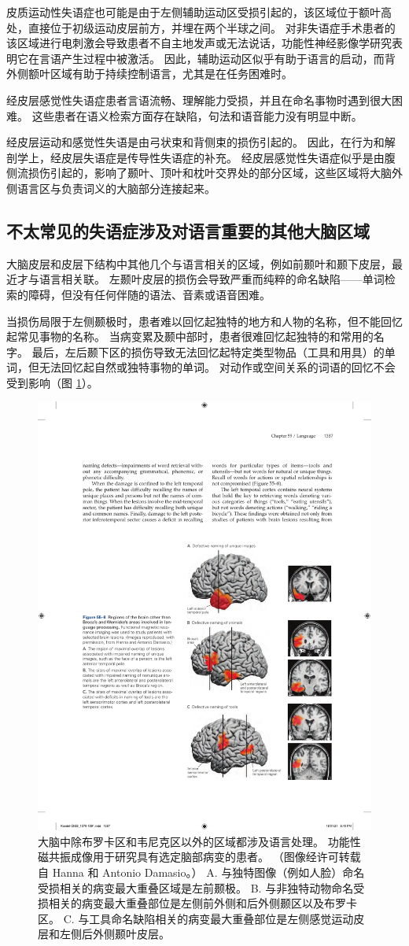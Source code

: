 皮质运动性失语症也可能是由于左侧辅助运动区受损引起的，该区域位于额叶高处，直接位于初级运动皮层前方，并埋在两个半球之间。 对非失语症手术患者的该区域进行电刺激会导致患者不自主地发声或无法说话，功能性神经影像学研究表明它在言语产生过程中被激活。 因此，辅助运动区似乎有助于语言的启动，而背外侧额叶区域有助于持续控制语言，尤其是在任务困难时。


经皮层感觉性失语症患者言语流畅、理解能力受损，并且在命名事物时遇到很大困难。 这些患者在语义检索方面存在缺陷，句法和语音能力没有明显中断。

经皮层运动和感觉性失语是由弓状束和背侧束的损伤引起的。 因此，在行为和解剖学上，经皮层失语症是传导性失语症的补充。 经皮层感觉性失语症似乎是由腹侧流损伤引起的，影响了颞叶、顶叶和枕叶交界处的部分区域，这些区域将大脑外侧语言区与负责词义的大脑部分连接起来。

\subsection{不太常见的失语症涉及对语言重要的其他大脑区域}

大脑皮层和皮层下结构中其他几个与语言相关的区域，例如前颞叶和颞下皮层，最近才与语言相关联。 左颞叶皮层的损伤会导致严重而纯粹的命名缺陷——单词检索的障碍，但没有任何伴随的语法、音素或语音困难。

当损伤局限于左侧颞极时，患者难以回忆起独特的地方和人物的名称，但不能回忆起常见事物的名称。 当病变累及颞中部时，患者很难回忆起独特的和常用的名字。 最后，左后颞下区的损伤导致无法回忆起特定类型物品（工具和用具）的单词，但无法回忆起自然或独特事物的单词。 对动作或空间关系的词语的回忆不会受到影响（图 \ref{fig:55_8}）。

\begin{figure}[htbp]
	\centering
	\includegraphics[width=0.65\linewidth]{chap55/fig_55_8}
	\caption{大脑中除布罗卡区和韦尼克区以外的区域都涉及语言处理。 功能性磁共振成像用于研究具有选定脑部病变的患者。 （图像经许可转载自 Hanna 和 Antonio Damasio。） A. 与独特图像（例如人脸）命名受损相关的病变最大重叠区域是左前颞极。 B. 与非独特动物命名受损相关的病变最大重叠部位是左侧前外侧和后外侧颞区以及布罗卡区。 C. 与工具命名缺陷相关的病变最大重叠部位是左侧感觉运动皮层和左侧后外侧颞叶皮层。}
	\label{fig:55_8}
\end{figure}

